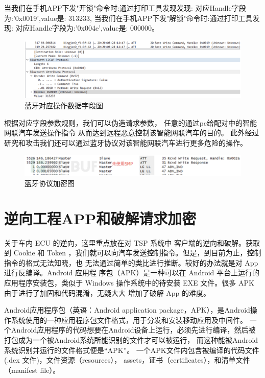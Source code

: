 当我们在手机APP下发"开锁"命令时:通过打印工具发现发现:
对应Handle字段为:'0x0019',value是: 313233,
当我们在手机APP下发"解锁"命令时:通过打印工具发现:
对应Handle字段为:'0x004e',value是: 000000。
\begin{figure}
    \centering
    \includegraphics[scale=0.5]{resources/img/i18.png}
    \caption{蓝牙对应操作数据字段图}
  \end{figure}
根据对应字段参数规则，我们可以伪造请求参数\cite{lu2005conditional}，
任意的通过pc给配对中的智能网联汽车发送操作指令
从而达到远程恶意控制该智能网联汽车的目的。
此外经过研究和攻击我们还可以通过蓝牙协议对该智能网联汽车进行更多危险的操作。
\begin{figure}
    \centering
    \includegraphics[scale=0.5]{resources/img/i16.png}
    \caption{蓝牙协议加密图}
  \end{figure}

\section{逆向工程APP和破解请求加密
}
关于车内 ECU 的逆向，这里重点放在对 TSP 系统中
客户端的逆向和破解。获取到 Cookie 和 Token ，我们就可以向汽车发送控制指令。但是，到目前为止，控制指令的格式无法知晓，也
无法通过简单的类比进行推断。较好的办法就是对 App 进行反编译\cite{yang2015automated}。Android 应用程
序包（APK）是一种可以在 Android 平台上运行的应用程序安装包，类似于 Windows
操作系统中的待安装 EXE 文件。很多 APK 由于进行了加固和代码混淆，无疑大大
增加了破解 App 的难度。

Android应用程序包（英语：Android application package，APK），是Android操作系统使用的一种应用程序包文件格式，用于分发和安装移动应用及中间件。
一个Android应用程序的代码想要在Android设备上运行，必须先进行编译，然后被打包成为一个被Android系统所能识别的文件才可以被运行，
而这种能被Android系统识别并运行的文件格式便是“APK”。 
一个APK文件内包含被编译的代码文件(.dex 文件)，文件资源（resources）， assets，证书（certificates），和清单文件（manifest file）。

